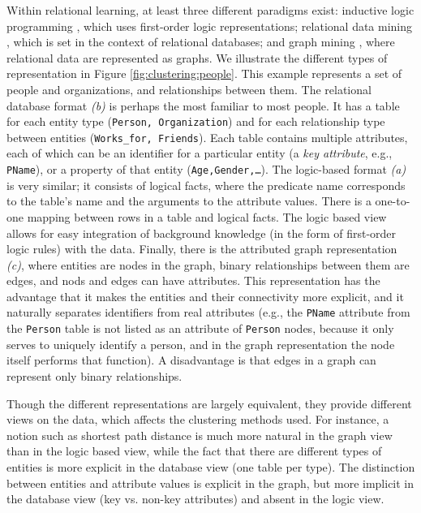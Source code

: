 Within relational learning, at least three different paradigms exist: inductive logic programming \cite{MuggletonR94}, which uses first-order logic representations; relational data mining \cite{DzeroskiB04}, which is set in the context of relational databases; and graph mining \cite{Cook2006}, where relational data are represented as graphs.  
We illustrate the different types of representation in Figure \ref{fig:clustering:people}.  
This example represents a set of people and organizations, and relationships between them.  
The relational database format \textit{(b)} is perhaps the most familiar to most people.
It has a table for each entity type ({\tt Person, Organization}) and for each relationship type between entities ({\tt Works\_for, Friends}).  
Each table contains multiple attributes, each of which can be an identifier for a particular entity (a \textit{key attribute}, e.g., {\tt PName}), or a property of that entity ({\tt Age,Gender,\ldots}).   
The logic-based format \textit{(a)} is very similar; it consists of logical facts, where the predicate name corresponds to the table’s name and the arguments to the attribute values.  
There is a one-to-one mapping between rows in a table and logical facts.  
The logic based view allows for easy integration of background knowledge (in the form of first-order logic rules) with the data.  
Finally, there is the attributed graph representation \textit{(c)}, where entities are nodes in the graph, binary relationships between them are edges, and nods and edges can have attributes.  
This representation has the advantage that it makes the entities and their connectivity more explicit, and it naturally separates identifiers from real attributes (e.g., the {\tt PName} attribute from the {\tt Person} table is not listed as an attribute of {\tt Person} nodes, because it only serves to uniquely identify a person, and in the graph representation the node itself performs that function).  
A disadvantage is that edges in a graph can represent only binary relationships.


Though the different representations are largely equivalent, they provide different views on the data, which affects the clustering methods used.  
For instance, a notion such as shortest path distance is much more natural in the graph view than in the logic based view, while the fact that there are  different types of entities is more explicit in the database view (one table per type).  
The distinction between entities and attribute values is explicit in the graph, but more implicit in the database view (key vs. non-key attributes) and absent in the logic view.


